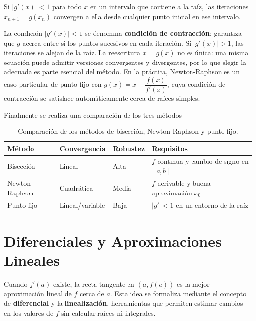 \begin{theorem}
Si $|g'(x)|<1$ para todo $x$ en un intervalo que contiene a la raíz,
las iteraciones $x_{n+1}=g(x_n)$ convergen a ella desde cualquier
punto inicial en ese intervalo.
\end{theorem}

\begin{rem}
La condición $|g'(x)|<1$ se denomina \textbf{condición de
contracción}: garantiza que $g$ acerca entre sí los puntos sucesivos
en cada iteración. Si $|g'(x)|>1$, las iteraciones se alejan de la
raíz. La reescritura $x=g(x)$ no es única: una misma ecuación puede
admitir versiones convergentes y divergentes, por lo que elegir la
adecuada es parte esencial del método. En la práctica, Newton-Raphson
es un caso particular de punto fijo con $g(x)=x-\dfrac{f(x)}{f'(x)}$,
cuya condición de contracción se satisface automáticamente cerca de
raíces simples.
\end{rem}

Finalmente se realiza una comparación de los tres métodos
\begin{table}[H]
\centering
\renewcommand{\arraystretch}{1.6}
\begin{tabular}{l l l l}
\toprule
\textbf{Método} & \textbf{Convergencia} & \textbf{Robustez}
& \textbf{Requisitos} \\
\midrule
Bisección      & Lineal      & Alta  &
  $f$ continua y cambio de signo en $[a,b]$ \\
Newton-Raphson & Cuadrática  & Media &
  $f$ derivable y buena aproximación $x_0$ \\
Punto fijo     & Lineal/variable & Baja  &
  $|g'|<1$ en un entorno de la raíz \\
\bottomrule
\end{tabular}
\caption{Comparación de los métodos de bisección, Newton-Raphson y punto fijo.}
\end{table}

\section{Diferenciales y Aproximaciones Lineales}

Cuando $f'(a)$ existe, la recta tangente en $(a,f(a))$ es la mejor
aproximación lineal de $f$ cerca de $a$. Esta idea se formaliza
mediante el concepto de \textbf{diferencial} y la
\textbf{linealización}, herramientas que permiten estimar cambios
en los valores de $f$ sin calcular raíces ni integrales.


